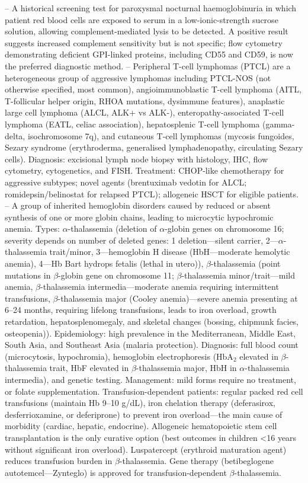 -- A historical screening test for paroxysmal nocturnal haemoglobinuria in which patient red blood cells are exposed to serum in a low-ionic-strength sucrose solution, allowing complement-mediated lysis to be detected. A positive result suggests increased complement sensitivity but is not specific; flow cytometry demonstrating deficient GPI-linked proteins, including CD55 and CD59, is now the preferred diagnostic method.
-- Peripheral T-cell lymphomas (PTCL) are a heterogeneous group of aggressive lymphomas including PTCL-NOS (not otherwise specified, most common), angioimmunoblastic T-cell lymphoma (AITL, T-follicular helper origin, RHOA mutations, dysimmune features), anaplastic large cell lymphoma (ALCL, ALK+ vs ALK-), enteropathy-associated T-cell lymphoma (EATL, celiac association), hepatosplenic T-cell lymphoma (gamma-delta, isochromosome 7q), and cutaneous T-cell lymphomas (mycosis fungoides, Sezary syndrome (erythroderma, generalised lymphadenopathy, circulating Sezary cells). Diagnosis: excisional lymph node biopsy with histology, IHC, flow cytometry, cytogenetics, and FISH. Treatment: CHOP-like chemotherapy for aggressive subtypes; novel agents (brentuximab vedotin for ALCL; romidepsin/belinostat for relapsed PTCL); allogeneic HSCT for eligible patients.
-- A group of inherited hemoglobin disorders caused by reduced or absent synthesis of one or more globin chains, leading to microcytic hypochromic anemia. Types: $\alpha$-thalassemia (deletion of $\alpha$-globin genes on chromosome 16; severity depends on number of deleted genes: 1 deletion—silent carrier, 2—$\alpha$-thalassemia trait/minor, 3—hemoglobin H disease (HbH—moderate hemolytic anemia), 4—Hb Bart hydrops fetalis (lethal in utero)), $\beta$-thalassemia (point mutations in $\beta$-globin gene on chromosome 11; $\beta$-thalassemia minor/trait—mild anemia, $\beta$-thalassemia intermedia—moderate anemia requiring intermittent transfusions, $\beta$-thalassemia major (Cooley anemia)—severe anemia presenting at 6--24 months, requiring lifelong transfusions, leads to iron overload, growth retardation, hepatosplenomegaly, and skeletal changes (bossing, chipmunk facies, osteopenia)). Epidemiology: high prevalence in the Mediterranean, Middle East, South Asia, and Southeast Asia (malaria protection). Diagnosis: full blood count (microcytosis, hypochromia), hemoglobin electrophoresis (HbA$_2$ elevated in $\beta$-thalassemia trait, HbF elevated in $\beta$-thalassemia major, HbH in $\alpha$-thalassemia intermedia), and genetic testing. Management: mild forms require no treatment, or folate supplementation. Transfusion-dependent patients: regular packed red cell transfusions (maintain Hb 9--10 g/dL), iron chelation therapy (deferasirox, desferrioxamine, or deferiprone) to prevent iron overload—the main cause of morbidity (cardiac, hepatic, endocrine). Allogeneic hematopoietic stem cell transplantation is the only curative option (best outcomes in children <16 years without significant iron overload). Luspatercept (erythroid maturation agent) reduces transfusion burden in $\beta$-thalassemia. Gene therapy (betibeglogene autotemcel—Zynteglo) is approved for transfusion-dependent $\beta$-thalassemia.
